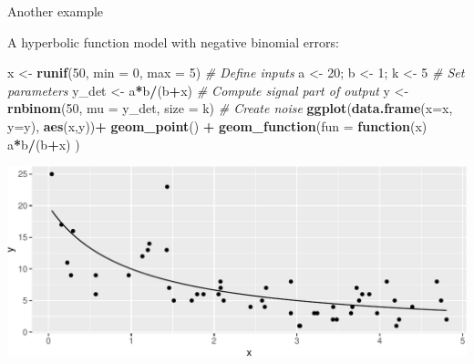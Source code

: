 \documentclass[
  ignorenonframetext,
]{beamer}
\newenvironment{Shaded}{\begin{snugshade}}{\end{snugshade}}
\newcommand{\CommentTok}[1]{\textcolor[rgb]{0.56,0.35,0.01}{\textit{#1}}}
\newcommand{\ControlFlowTok}[1]{\textcolor[rgb]{0.13,0.29,0.53}{\textbf{#1}}}
\newcommand{\DataTypeTok}[1]{\textcolor[rgb]{0.13,0.29,0.53}{#1}}
\newcommand{\DecValTok}[1]{\textcolor[rgb]{0.00,0.00,0.81}{#1}}
\newcommand{\KeywordTok}[1]{\textcolor[rgb]{0.13,0.29,0.53}{\textbf{#1}}}
\newcommand{\NormalTok}[1]{#1}
\newcommand{\OperatorTok}[1]{\textcolor[rgb]{0.81,0.36,0.00}{\textbf{#1}}}
\newcommand{\StringTok}[1]{\textcolor[rgb]{0.31,0.60,0.02}{#1}}
\begin{document}
\begin{frame}[fragile]{Another example}
\protect\hypertarget{another-example}{}

A hyperbolic function model with negative binomial errors:

\scriptsize

\begin{Shaded}
\begin{Highlighting}[]
\NormalTok{x <-}\StringTok{ }\KeywordTok{runif}\NormalTok{(}\DecValTok{50}\NormalTok{, }\DataTypeTok{min =} \DecValTok{0}\NormalTok{, }\DataTypeTok{max =} \DecValTok{5}\NormalTok{) }\CommentTok{# Define inputs}
\NormalTok{a <-}\StringTok{ }\DecValTok{20}\NormalTok{; b <-}\StringTok{ }\DecValTok{1}\NormalTok{; k <-}\StringTok{ }\DecValTok{5} \CommentTok{# Set parameters}
\NormalTok{y_det <-}\StringTok{ }\NormalTok{a}\OperatorTok{*}\NormalTok{b}\OperatorTok{/}\NormalTok{(b}\OperatorTok{+}\NormalTok{x) }\CommentTok{# Compute signal part of output}
\NormalTok{y <-}\StringTok{ }\KeywordTok{rnbinom}\NormalTok{(}\DecValTok{50}\NormalTok{, }\DataTypeTok{mu =}\NormalTok{ y_det, }\DataTypeTok{size =}\NormalTok{ k) }\CommentTok{# Create noise}
\KeywordTok{ggplot}\NormalTok{(}\KeywordTok{data.frame}\NormalTok{(}\DataTypeTok{x=}\NormalTok{x, }\DataTypeTok{y=}\NormalTok{y), }\KeywordTok{aes}\NormalTok{(x,y))}\OperatorTok{+}\StringTok{ }
\StringTok{  }\KeywordTok{geom_point}\NormalTok{() }\OperatorTok{+}\StringTok{ }\KeywordTok{geom_function}\NormalTok{(}\DataTypeTok{fun =} \ControlFlowTok{function}\NormalTok{(x) a}\OperatorTok{*}\NormalTok{b}\OperatorTok{/}\NormalTok{(b}\OperatorTok{+}\NormalTok{x) )}
\end{Highlighting}
\end{Shaded}

\includegraphics{simulation_files/figure-beamer/unnamed-chunk-10-1.pdf}

\end{frame}
\end{document}
